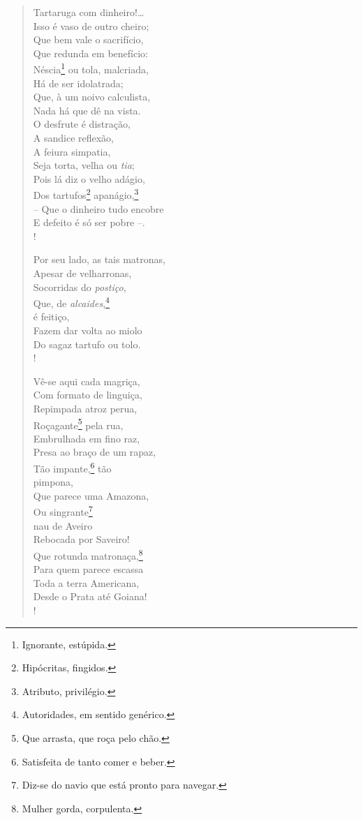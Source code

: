 \begin{verse}
Tartaruga com dinheiro!\ldots{}\\
Isso é vaso de outro cheiro;\\
Que bem vale o sacrifício,\\
Que redunda em benefício:\\
Néscia\footnote{ Ignorante, estúpida.} ou tola, malcriada,\\
Há de ser idolatrada;\\
Que, à um noivo calculista,\\
Nada há que dê na vista.\\
O desfrute é distração,\\
A sandice reflexão,\\
A feiura simpatia,\\
Seja torta, velha ou \emph{tia};\\
Pois lá diz o velho adágio,\\
Dos tartufos\footnote{ Hipócritas, fingidos.} apanágio,\footnote{ Atributo, privilégio.}\\
-- Que o dinheiro tudo encobre\\
E defeito é só ser pobre --.\\!

Por seu lado, as tais matronas,\\
Apesar de velharronas,\\
Socorridas do \emph{postiço},\\
Que, de \emph{alcaides},\footnote{ Autoridades, em sentido genérico.}\\
é feitiço,\\
Fazem dar volta ao miolo\\
Do sagaz tartufo ou tolo.\\!

Vê-se aqui cada magriça,\\
Com formato de linguiça,\\
Repimpada atroz perua,\\
Roçagante\footnote{ Que arrasta, que roça pelo chão.} pela rua,\\
Embrulhada em fino raz,\\
Presa ao braço de um rapaz,\\
Tão impante,\footnote{ Satisfeita de tanto comer e beber.} tão\\
pimpona,\\
Que parece uma Amazona,\\
Ou singrante\footnote{ Diz-se do navio que está pronto para navegar.}\\
nau de Aveiro\\
Rebocada por Saveiro!\\
Que rotunda matronaça,\footnote{ Mulher gorda, corpulenta.}\\
Para quem parece escassa\\
Toda a terra Americana,\\
Desde o Prata até Goiana!\\!


\end{verse}
